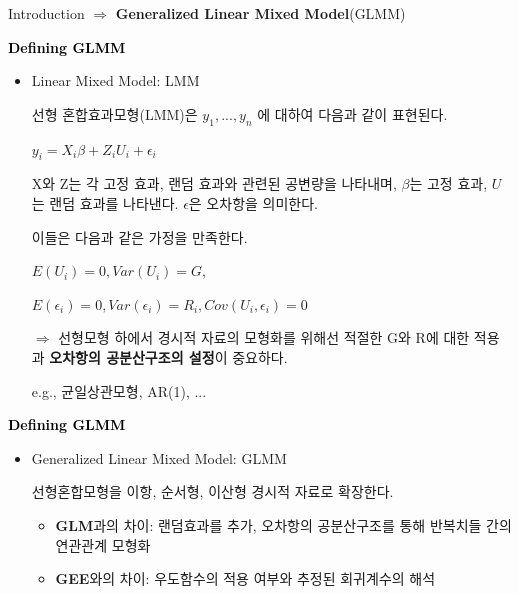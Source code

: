 \documentclass[9pt, xelatex]{beamer}
\begin{document}
{\begin{frame}[allowframebreaks]{Introduction}
		$\Longrightarrow$ \textbf{Generalized Linear Mixed Model}(GLMM)	
		\framebreak
		
		
		\textcolor{black}{\textbf{Defining GLMM}}
		\vspace{2mm}
		\begin{itemize}
			\item Linear Mixed Model: LMM
			\vspace{3mm}
			
			선형 혼합효과모형(LMM)은	$ y_{1},...,y_{n} $ 에 대하여 다음과 같이 표현된다.
			
			\begin{center} $ y_{i}=X_{i}\beta+Z_{i}U_{i}+\epsilon_{i} $\end{center}
			
			X와 Z는 각 고정 효과, 랜덤 효과와 관련된 공변량을 나타내며, $\beta$는 고정 효과, $U$는 랜덤 효과를 나타낸다. $\epsilon$은 오차항을 의미한다.
			\vspace{3mm}
			
			이들은 다음과 같은 가정을 만족한다.
			
			\begin{center}
				$E(U_{i})=0,Var(U_{i})=G$,
				
				$E(\epsilon_{i})=0,		Var(\epsilon_{i})=R_{i},		Cov(U_{i},\epsilon_{i})=0$
			\end{center}
			\vspace{2mm}
			
			$\Rightarrow$ 선형모형 하에서 경시적 자료의 모형화를 위해선 적절한  G와 R에 대한 적용과 \textbf{오차항의 공분산구조의 설정}이 중요하다. 
			\vspace{2mm}
			
			e.g., 균일상관모형, AR(1), ...
		\end{itemize}
		\framebreak
		
		
		\textcolor{black}{\textbf{Defining GLMM}}
		\vspace{2mm}
		\begin{itemize}
			\item Generalized Linear Mixed Model: GLMM
			\vspace{3mm}
			
			선형혼합모형을 이항, 순서형, 이산형 경시적 자료로 확장한다.
			\begin{center}
				\begin{itemize}
					\item \textbf{GLM}과의 차이: 랜덤효과를 추가, 오차항의 공분산구조를 통해 반복치들 간의 연관관계 모형화
					\item \textbf{GEE}와의 차이: 우도함수의 적용 여부와 추정된 회귀계수의 해석
				\end{itemize}
			\end{center}
			

\end{itemize}
\end{frame}}
\end{document}
